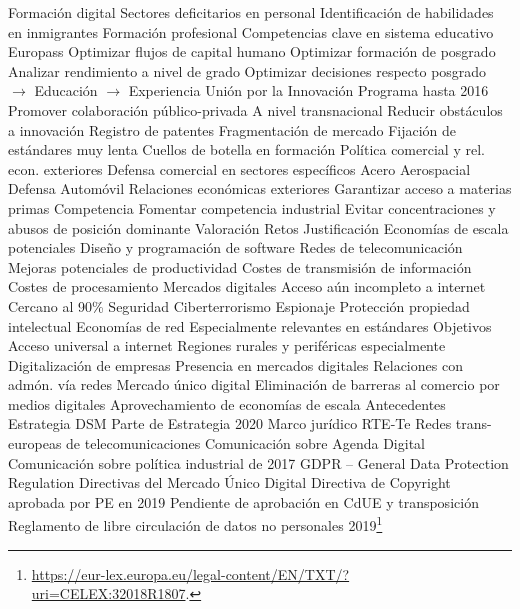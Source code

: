 \documentclass{nuevotema}
\begin{document}
\begin{esquemal}
				\4 Formación digital
				\4 Sectores deficitarios en personal
				\4 Identificación de habilidades en inmigrantes
				\4 Formación profesional
				\4 Competencias clave en sistema educativo
				\4 Europass
				\4 Optimizar flujos de capital humano
				\4 Optimizar formación de posgrado
				\4[] Analizar rendimiento a nivel de grado
				\4[] Optimizar decisiones respecto posgrado
				\4[] $\to$ Educación
				\4[] $\to$ Experiencia
			\3 Unión por la Innovación
				\4 Programa hasta 2016
				\4 Promover colaboración público-privada
				\4[] A nivel transnacional
				\4 Reducir obstáculos a innovación
				\4[] Registro de patentes
				\4[] Fragmentación de mercado
				\4[] Fijación de estándares muy lenta
				\4[] Cuellos de botella en formación
			\3 Política comercial y rel. econ. exteriores
				\4 Defensa comercial en sectores específicos
				\4[] Acero
				\4[] Aerospacial
				\4[] Defensa
				\4[] Automóvil
				\4 Relaciones económicas exteriores
				\4[] Garantizar acceso a materias primas
			\3 Competencia
				\4 Fomentar competencia industrial
				\4[] Evitar concentraciones y abusos de posición dominante
		\2 Valoración
		\2 Retos
	\1 
		\2 Justificación
			\3 Economías de escala potenciales
				\4 Diseño y programación de software
				\4 Redes de telecomunicación
			\3 Mejoras potenciales de productividad
				\4 Costes de transmisión de información
				\4 Costes de procesamiento
				\4 Mercados digitales
			\3 Acceso aún incompleto a internet
				\4 Cercano al 90\%
			\3 Seguridad
				\4 Ciberterrorismo
				\4 Espionaje
				\4 Protección propiedad intelectual
			\3 Economías de red
				\4 Especialmente relevantes en estándares
		\2 Objetivos
			\3 Acceso universal a internet
				\4 Regiones rurales y periféricas especialmente
			\3 Digitalización de empresas
				\4 Presencia en mercados digitales
				\4 Relaciones con admón. vía redes
			\3 Mercado único digital
				\4 Eliminación de barreras al comercio por medios digitales
			\3 Aprovechamiento de economías de escala
		\2 Antecedentes
			\3 Estrategia DSM
				\4 Parte de Estrategia 2020
		\2 Marco jurídico
			\3 RTE-Te
				\4 Redes trans-europeas de telecomunicaciones
			\3 Comunicación sobre Agenda Digital
			\3 Comunicación sobre política industrial de 2017
			\3 GDPR -- General Data Protection Regulation
			\3 Directivas del Mercado Único Digital
			\3 Directiva de Copyright aprobada por PE en 2019
				\4 Pendiente de aprobación en CdUE y transposición
			\3 Reglamento de libre circulación de datos no personales 2019\footnote{\url{https://eur-lex.europa.eu/legal-content/EN/TXT/?uri=CELEX:32018R1807}.}

\end{esquemal}
\end{document}
